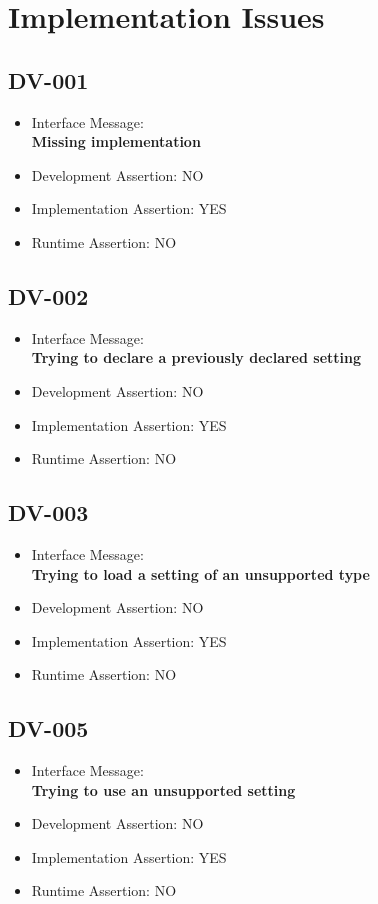 \section{Implementation Issues}

\subsection{DV-001}
\begin{itemize}
  \item Interface Message:\\[1em]\textbf{Missing implementation}
  \item Development Assertion: NO
  \item Implementation Assertion: YES
  \item Runtime Assertion: NO
\end{itemize}

\subsection{DV-002}
\begin{itemize}
  \item Interface Message:\\[1em]\textbf{Trying to declare a previously declared setting}
  \item Development Assertion: NO
  \item Implementation Assertion: YES
  \item Runtime Assertion: NO
\end{itemize}

\subsection{DV-003}
\begin{itemize}
  \item Interface Message:\\[1em]\textbf{Trying to load a setting of an unsupported type}
  \item Development Assertion: NO
  \item Implementation Assertion: YES
  \item Runtime Assertion: NO
\end{itemize}

\subsection{DV-005}
\begin{itemize}
  \item Interface Message:\\[1em]\textbf{Trying to use an unsupported setting}
  \item Development Assertion: NO
  \item Implementation Assertion: YES
  \item Runtime Assertion: NO
\end{itemize}

